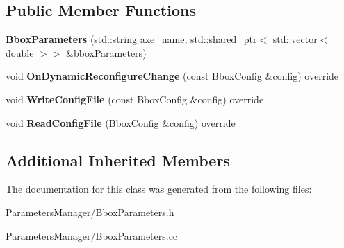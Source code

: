 \subsection*{Public Member Functions}
\begin{DoxyCompactItemize}
\item 
\mbox{\label{classproc__control_1_1_bbox_parameters_a50eb03ac9ebdf9fc7cfd5efc67d87856}} 
{\bfseries Bbox\+Parameters} (std\+::string axe\+\_\+name, std\+::shared\+\_\+ptr$<$ std\+::vector$<$ double $>$$>$ \&bbox\+Parameters)
\item 
\mbox{\label{classproc__control_1_1_bbox_parameters_a114e932b6dfde1b4acfddc87c2a28038}} 
void {\bfseries On\+Dynamic\+Reconfigure\+Change} (const Bbox\+Config \&config) override
\item 
\mbox{\label{classproc__control_1_1_bbox_parameters_a4528ed0506741ee73524c0efad5bc6d9}} 
void {\bfseries Write\+Config\+File} (const Bbox\+Config \&config) override
\item 
\mbox{\label{classproc__control_1_1_bbox_parameters_a62e2f1398edeaf66ea54453a97a7f124}} 
void {\bfseries Read\+Config\+File} (Bbox\+Config \&config) override
\end{DoxyCompactItemize}
\subsection*{Additional Inherited Members}


The documentation for this class was generated from the following files\+:\begin{DoxyCompactItemize}
\item 
Parameters\+Manager/Bbox\+Parameters.\+h\item 
Parameters\+Manager/Bbox\+Parameters.\+cc\end{DoxyCompactItemize}
